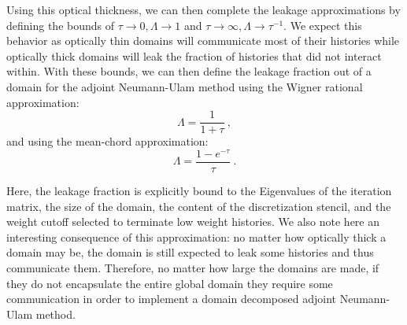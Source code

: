 \documentclass[letterpaper,12pt]{article}
\begin{document}
Using this optical thickness, we can then complete the leakage
approximations by defining the bounds of $\tau \rightarrow 0, \Lambda
\rightarrow 1$ and $\tau \rightarrow \infty, \Lambda \rightarrow
\tau^{-1}$. We expect this behavior as optically thin domains will
communicate most of their histories while optically thick domains will
leak the fraction of histories that did not interact within. With
these bounds, we can then define the leakage fraction out of a domain
for the adjoint Neumann-Ulam method using the Wigner rational
approximation:
\begin{equation}
  \Lambda = \frac{1}{1+\tau}\:,
  \label{eq:wigner_domain_leakage}
\end{equation}
and using the mean-chord approximation:
\begin{equation}
  \Lambda = \frac{1-e^{-\tau}}{\tau}\:.
  \label{eq:mean_chord_domain_leakage}
\end{equation}

Here, the leakage fraction is explicitly bound to the Eigenvalues of
the iteration matrix, the size of the domain, the content of the
discretization stencil, and the weight cutoff selected to terminate
low weight histories.  We also note here an interesting consequence of
this approximation: no matter how optically thick a domain may be, the
domain is still expected to leak some histories and thus communicate
them. Therefore, no matter how large the domains are made, if they do
not encapsulate the entire global domain they require some
communication in order to implement a domain decomposed adjoint
Neumann-Ulam method.

\end{document}
